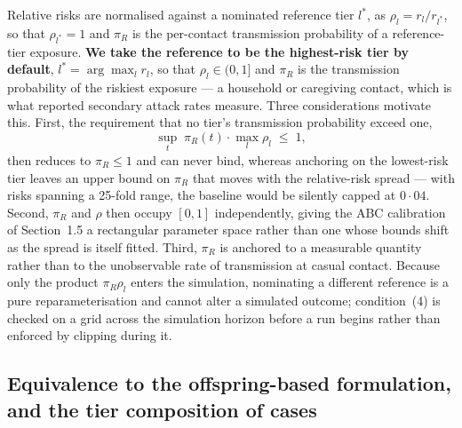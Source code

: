 \documentclass[9pt,letterpaper]{extarticle}
\begin{document}
Relative risks are normalised against a nominated reference tier $l^{*}$, as $\rho_l = r_l / r_{l^{*}}$, so that $\rho_{l^{*}} = 1$ and $\pi_R$ is the per-contact transmission probability of a reference-tier exposure. \textbf{We take the reference to be the highest-risk tier by default}, $l^{*} = \arg\max_l r_l$, so that $\rho_l \in (0,1]$ and $\pi_R$ is the transmission probability of the riskiest exposure --- a household or caregiving contact, which is what reported secondary attack rates measure. Three considerations motivate this. First, the requirement that no tier's transmission probability exceed one,
\begin{equation}
\sup_{t}\; \pi_R(t) \cdot \max_l \rho_l \;\le\; 1 ,
\end{equation}
then reduces to $\pi_R \le 1$ and can never bind, whereas anchoring on the lowest-risk tier leaves an upper bound on $\pi_R$ that moves with the relative-risk spread --- with risks spanning a 25-fold range, the baseline would be silently capped at $0{\cdot}04$. Second, $\pi_R$ and $\rho$ then occupy $[0,1]$ independently, giving the ABC calibration of Section~1.5 a rectangular parameter space rather than one whose bounds shift as the spread is itself fitted. Third, $\pi_R$ is anchored to a measurable quantity rather than to the unobservable rate of transmission at casual contact. Because only the product $\pi_R \rho_l$ enters the simulation, nominating a different reference is a pure reparameterisation and cannot alter a simulated outcome; condition~(4) is checked on a grid across the simulation horizon before a run begins rather than enforced by clipping during it.

\subsection{Equivalence to the offspring-based formulation, and the tier composition of cases}
\end{document}
